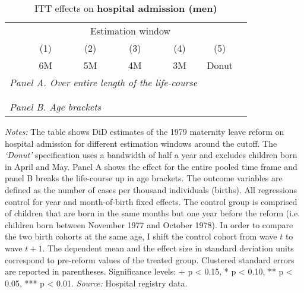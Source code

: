  \vspace*{\fill}
 \begin{table}[H] \centering 
 	\begin{threeparttable} \centering \caption{ITT effects on \textbf{hospital admission (men)}}\label{tab: DD_hopsital2_male} {\def\sym#1{\ifmmode^{#1}\else\(^{#1}\)\fi} 
 		\begin{tabular}{l*{6}{c}}
 			\toprule 
 			& \multicolumn{5}{c}{Estimation window} \\ 
 			\cmidrule(lr){2-6}
 			&\multicolumn{1}{c}{(1)}&\multicolumn{1}{c}{(2)}&\multicolumn{1}{c}{(3)}&\multicolumn{1}{c}{(4)}&\multicolumn{1}{c}{(5)}\\
 			&\multicolumn{1}{c}{6M}&\multicolumn{1}{c}{5M}&\multicolumn{1}{c}{4M}&\multicolumn{1}{c}{3M}&\multicolumn{1}{c}{Donut}\\
 				\midrule
 				\multicolumn{5}{l}{\emph{Panel A. Over entire length of the life-course}} \\
 				 \\ \\
 				\multicolumn{5}{l}{\emph{Panel B. Age brackets}} \\
 				    
 				\bottomrule 
 		\end{tabular}}
 		\begin{tablenotes} 
 			\item \scriptsize \emph{Notes:} The table shows DiD estimates of the 1979 maternity leave reform on hospital admission for different estimation windows around the cutoff. The \textit{`Donut'} specification uses a bandwidth of half a year and excludes children born in April and May. Panel A shows the effect for the entire pooled time frame and panel B breaks the life-course up in age brackets. The outcome variables are defined as the number of cases per thousand individuals (births). All regressions control for year and month-of-birth fixed effects. The control group is comprised of children that are born in the same months but one year before the reform (i.e. children born between November 1977 and October 1978). In order to compare the two birth cohorts at the same age, I shift the control cohort from wave $t$ to wave $t+1$. The dependent mean and the effect size in standard deviation units correspond to pre-reform values of the treated group. Clustered standard errors are reported in parentheses. \newline Significance levels: + p < 0.15, * p < 0.10, ** p < 0.05, *** p < 0.01. \newline 	\emph{Source:} Hospital registry data.
 		\end{tablenotes} 
 	\end{threeparttable} 
 \end{table} 
\vspace*{\fill}\clearpage 